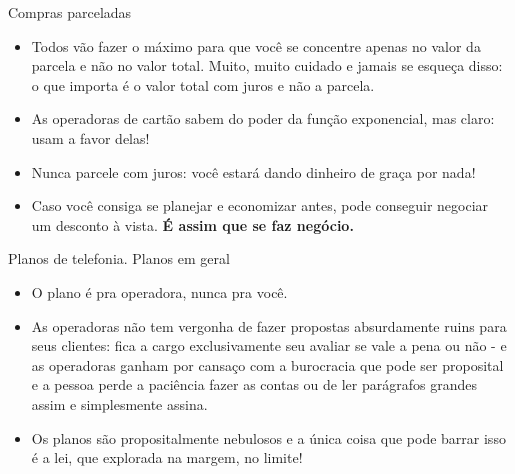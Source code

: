 \documentclass[]{beamer}
\begin{document}
\begin{frame}{Compras parceladas}

  \begin{itemize}
    \item Todos vão fazer o máximo para que você se
      concentre apenas no valor da parcela e não no valor
      total. Muito, muito cuidado e jamais se esqueça disso:
      o que importa é o valor total com juros e não a
      parcela.
      \pause
\item As operadoras de cartão sabem do poder da função
  exponencial, mas claro: usam a favor delas!
\item Nunca parcele com juros: você estará dando dinheiro de
  graça por nada!
  \pause
\item Caso você consiga se planejar e economizar antes, pode
  conseguir negociar um desconto à vista. \textbf{É assim que se faz negócio.}
\end{itemize}

\end{frame}
\begin{frame}{Planos de telefonia. Planos em geral}
  \begin{itemize}
  \item O plano é pra operadora, nunca pra você.
    \pause
    \item As operadoras não tem vergonha de fazer propostas
      absurdamente ruins para seus clientes: fica a cargo
      exclusivamente seu avaliar se vale a pena ou não - e
      as operadoras ganham por cansaço com a burocracia que
      pode ser proposital e a pessoa perde a
      paciência fazer as contas ou de
      ler parágrafos grandes assim e
      simplesmente assina.
      \pause
    \item Os planos são propositalmente nebulosos e a única
      coisa que pode barrar isso é a lei, que explorada na
      margem, no limite!
    \end{itemize}
    \pause


    
  \end{frame}
\end{document}
